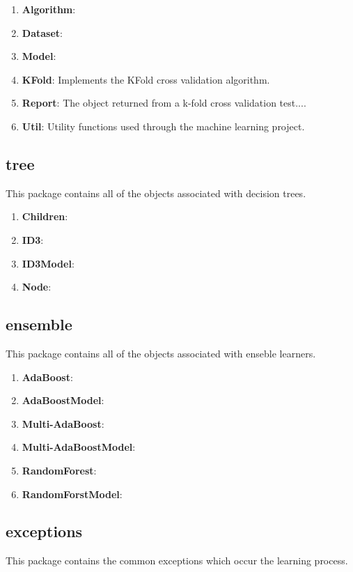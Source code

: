 \documentclass[11pt]{article}
\newcommand{\bb}{\textbf}
\begin{document}
\begin{enumerate}[leftmargin=*]
  \item[] \bb{Algorithm}:
  \item[] \bb{Dataset}:
  \item[] \bb{Model}:
  \item[] \bb{KFold}: Implements the KFold cross validation algorithm.
  \item[] \bb{Report}: The object returned from a k-fold cross validation test....
  \item[] \bb{Util}: Utility functions used through the machine learning project.
\end{enumerate}

\subsection{tree}
This package contains all of the objects associated with decision trees.

\begin{enumerate}[leftmargin=*]
  \item[] \bb{Children}:
  \item[] \bb{ID3}:
  \item[] \bb{ID3Model}:
  \item[] \bb{Node}:
\end{enumerate}

\subsection{ensemble}
This package contains all of the objects associated with enseble learners.

\begin{enumerate}[leftmargin=*]
  \item[] \bb{AdaBoost}:
  \item[] \bb{AdaBoostModel}:
  \item[] \bb{Multi-AdaBoost}:
  \item[] \bb{Multi-AdaBoostModel}:
  \item[] \bb{RandomForest}:
  \item[] \bb{RandomForstModel}:
\end{enumerate}

\subsection{exceptions}
This package contains the common exceptions which occur the learning process.
\end{document}
